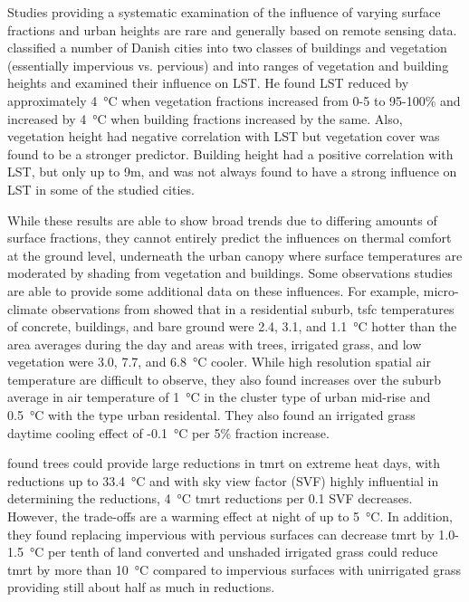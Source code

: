 \documentclass[final,3p,times,authoryear]{elsarticle}
\begin{document}
Studies providing a systematic examination of the influence of varying surface fractions and urban heights are rare and generally based on remote sensing data. \cite{Alexander2021} classified a number of Danish cities into two classes of buildings and vegetation (essentially impervious vs. pervious) and into ranges of vegetation and building heights and examined their influence on LST. He found LST reduced by approximately 4\SI{}{\degreeCelsius} when vegetation fractions increased from 0-5 to 95-100\% and increased by 4\SI{}{\degreeCelsius} when building fractions increased by the same. Also, vegetation height had negative correlation with LST but vegetation cover was found to be a stronger predictor. Building height had a positive correlation with LST, but only up to 9m, and was not always found to have a strong influence on LST in some of the studied cities.

While these results are able to show broad trends due to differing amounts of surface fractions, they cannot entirely predict the influences on thermal comfort at the ground level, underneath the urban canopy where surface temperatures are moderated by shading from vegetation and buildings. Some observations studies are able to provide some additional data on these influences. For example, micro-climate observations from \cite{Broadbent2017a} showed that in a residential suburb, \gls{tsfc} temperatures of concrete, buildings, and bare ground were 2.4, 3.1, and 1.1\SI{}{\degreeCelsius} hotter than the area averages during the day and areas with trees, irrigated grass, and low vegetation were 3.0, 7.7, and 6.8\SI{}{\degreeCelsius} cooler. While high resolution spatial air temperature are difficult to observe, they also found increases over the suburb average in air temperature of 1\SI{}{\degreeCelsius} in the cluster type of urban mid-rise and 0.5\SI{}{\degreeCelsius} with the type urban residental. They also found an irrigated grass daytime cooling effect of -0.1\SI{}{\degreeCelsius} per 5\% fraction increase.

\cite{Middel2019a} found trees could provide large reductions in \gls{tmrt} on extreme heat days, with reductions up to 33.4\SI{}{\degreeCelsius} and with sky view factor (SVF) highly influential in determining the reductions, 4\SI{}{\degreeCelsius} \gls{tmrt} reductions per 0.1 SVF decreases. However, the trade-offs are a warming effect at night of up to 5\SI{}{\degreeCelsius}. In addition, they found replacing impervious with pervious surfaces can decrease \gls{tmrt} by 1.0-1.5\SI{}{\degreeCelsius} per tenth of land converted and unshaded irrigated grass could reduce \gls{tmrt} by more than 10\SI{}{\degreeCelsius} compared to impervious surfaces with unirrigated grass providing still about half as much in reductions.
\end{document}
